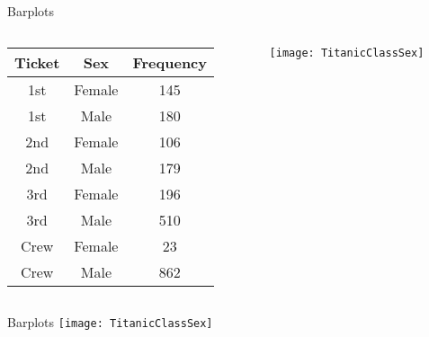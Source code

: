 \documentclass[xcolor=dvipsnames]{beamer}
\begin{document}
\begin{frame}{Barplots}
\begin{columns}
	\begin{column}{0.43 \textwidth}
		\begin{tabular}{|c|c|c|}
			\hline
			\textbf{Ticket} & \textbf{Sex} & \textbf{Frequency} \\
			\hline \hline
			1st & Female & 145\\
			\hline
			1st &  Male & 180\\
			\hline
			2nd & Female & 106\\
			\hline
			2nd  & Male & 179\\
			\hline
			3rd & Female & 196\\
			\hline
			3rd  & Male & 510\\
			\hline
			Crew & Female &  23\\
			\hline
			Crew  & Male & 862\\
			\hline
		\end{tabular}
	\end{column} \pause
	\begin{column}{0.57 \textwidth}
		\texttt{[image: TitanicClassSex]}
	\end{column}
\end{columns}
\end{frame}

\begin{frame}{Barplots}
\texttt{[image: TitanicClassSex]}
\end{frame}
\end{document}
